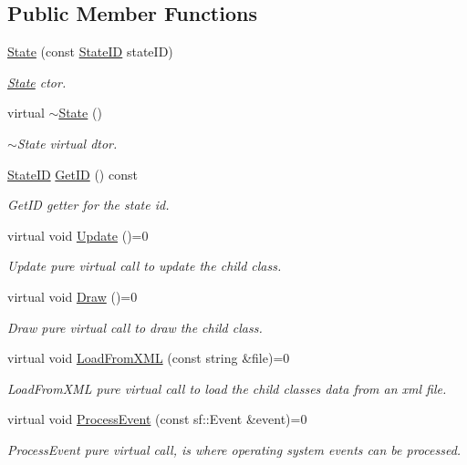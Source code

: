\subsection*{Public Member Functions}
\begin{DoxyCompactItemize}
\item 
\hyperlink{class_state_a4da3d6c4c175efa74f87a1d413a4486b}{State} (const \hyperlink{_state_8hpp_a905494cc15ee9757a813dbfe4b1072fe}{State\-I\-D} state\-I\-D)
\begin{DoxyCompactList}\small\item\em \hyperlink{class_state}{State} ctor. \end{DoxyCompactList}\item 
virtual \hyperlink{class_state_afab438d92b90dc18d194dbd9c9c8bab3}{$\sim$\-State} ()
\begin{DoxyCompactList}\small\item\em $\sim$\-State virtual dtor. \end{DoxyCompactList}\item 
\hyperlink{_state_8hpp_a905494cc15ee9757a813dbfe4b1072fe}{State\-I\-D} \hyperlink{class_state_ab7022716d4d0c7aec82dbdd90e1e039e}{Get\-I\-D} () const 
\begin{DoxyCompactList}\small\item\em Get\-I\-D getter for the state id. \end{DoxyCompactList}\item 
virtual void \hyperlink{class_state_a43d4ca30d927c023316c058b700c0716}{Update} ()=0
\begin{DoxyCompactList}\small\item\em Update pure virtual call to update the child class. \end{DoxyCompactList}\item 
virtual void \hyperlink{class_state_a8b0cdb0e7450a9bb3580a33dfbe4d981}{Draw} ()=0
\begin{DoxyCompactList}\small\item\em Draw pure virtual call to draw the child class. \end{DoxyCompactList}\item 
virtual void \hyperlink{class_state_a8c96aac63e62b9b6bb491cae071d08f2}{Load\-From\-X\-M\-L} (const string \&file)=0
\begin{DoxyCompactList}\small\item\em Load\-From\-X\-M\-L pure virtual call to load the child classes data from an xml file. \end{DoxyCompactList}\item 
virtual void \hyperlink{class_state_aac4126b251b0c55d5c934982310c80ae}{Process\-Event} (const sf\-::\-Event \&event)=0
\begin{DoxyCompactList}\small\item\em Process\-Event pure virtual call, is where operating system events can be processed. \end{DoxyCompactList}\end{DoxyCompactItemize}
